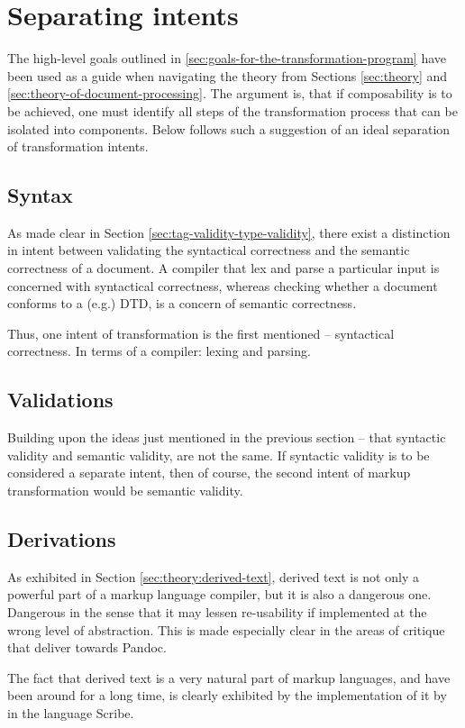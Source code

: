\documentclass{scrreprt}
\begin{document}
\section{Separating intents}
The high-level goals outlined in \ref{sec:goals-for-the-transformation-program} have been used as a guide when navigating the theory from Sections \ref{sec:theory} and \ref{sec:theory-of-document-processing}. The argument is, that if composability is to be achieved, one must identify all steps of the transformation process that can be isolated into components. Below follows such a suggestion of an ideal separation of transformation intents.


\subsection{Syntax}
As made clear in Section \ref{sec:tag-validity-type-validity}, there exist a distinction in intent between validating the syntactical correctness and the semantic correctness of a document. A compiler that lex and parse a particular input is concerned with syntactical correctness, whereas checking whether a document conforms to a (e.g.) DTD, is a concern of semantic correctness.

Thus, one intent of transformation is the first mentioned -- syntactical correctness. In terms of a compiler: lexing and parsing.

\subsection{Validations}
Building upon the ideas just mentioned in the previous section -- that syntactic validity and semantic validity, are not the same. If syntactic validity is to be considered a separate intent, then of course, the second intent of markup transformation would be semantic validity.

\subsection{Derivations}
As exhibited in Section \ref{sec:theory:derived-text}, derived text is not only a powerful part of a markup language compiler, but it is also a dangerous one. Dangerous in the sense that it may lessen re-usability if implemented at the wrong level of abstraction. This is made especially clear in the areas of critique that \citet{krijnen} deliver towards Pandoc.

The fact that derived text is a very natural part of markup languages, and have been around for a long time, is clearly exhibited by the implementation of it by \citet{reid} in the language Scribe.
\end{document}
